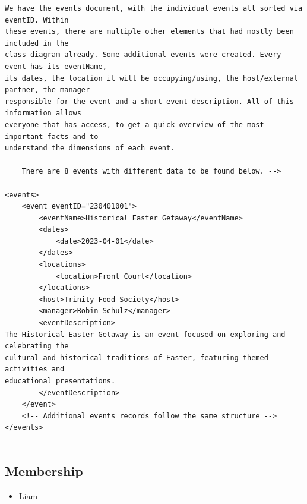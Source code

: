 \documentclass{article} %
\begin{document}
\begin{verbatim}
We have the events document, with the individual events all sorted via eventID. Within 
these events, there are multiple other elements that had mostly been included in the 
class diagram already. Some additional events were created. Every event has its eventName, 
its dates, the location it will be occupying/using, the host/external partner, the manager 
responsible for the event and a short event description. All of this information allows 
everyone that has access, to get a quick overview of the most important facts and to 
understand the dimensions of each event.

    There are 8 events with different data to be found below. -->

<events>
    <event eventID="230401001">
        <eventName>Historical Easter Getaway</eventName>
        <dates>
            <date>2023-04-01</date>
        </dates>
        <locations>
            <location>Front Court</location>
        </locations>
        <host>Trinity Food Society</host>
        <manager>Robin Schulz</manager>
        <eventDescription>
The Historical Easter Getaway is an event focused on exploring and celebrating the 
cultural and historical traditions of Easter, featuring themed activities and 
educational presentations.
        </eventDescription>
    </event>
    <!-- Additional events records follow the same structure -->
</events>
    
\end{verbatim}

\subsection{Membership}

\begin{itemize}
    \item Liam
\end{itemize}
\end{document}
